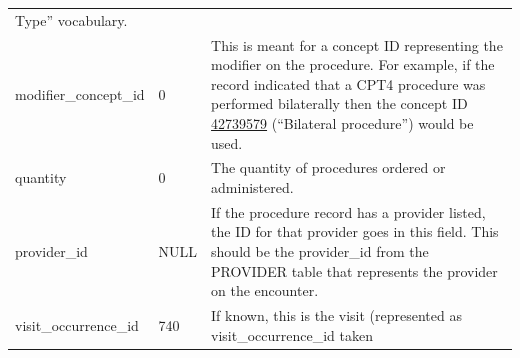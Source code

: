 \documentclass[11pt]{book}
\begin{document}
\begin{longtable}[]{@{}lll@{}}
\begin{minipage}[t]{0.48\columnwidth}
Type'' vocabulary.\strut
\end{minipage}\tabularnewline
\begin{minipage}[t]{0.28\columnwidth}\raggedright\strut
modifier\_concept\_id\strut
\end{minipage} & \begin{minipage}[t]{0.16\columnwidth}\raggedright\strut
0\strut
\end{minipage} & \begin{minipage}[t]{0.48\columnwidth}\raggedright\strut
This is meant for a concept ID representing the modifier on the
procedure. For example, if the record indicated that a CPT4 procedure
was performed bilaterally then the concept ID
\href{http://athena.ohdsi.org/search-terms/terms/42739579}{42739579}
(``Bilateral procedure'') would be used.\strut
\end{minipage}\tabularnewline
\begin{minipage}[t]{0.28\columnwidth}\raggedright\strut
quantity\strut
\end{minipage} & \begin{minipage}[t]{0.16\columnwidth}\raggedright\strut
0\strut
\end{minipage} & \begin{minipage}[t]{0.48\columnwidth}\raggedright\strut
The quantity of procedures ordered or administered.\strut
\end{minipage}\tabularnewline
\begin{minipage}[t]{0.28\columnwidth}\raggedright\strut
provider\_id\strut
\end{minipage} & \begin{minipage}[t]{0.16\columnwidth}\raggedright\strut
NULL\strut
\end{minipage} & \begin{minipage}[t]{0.48\columnwidth}\raggedright\strut
If the procedure record has a provider listed, the ID for that provider
goes in this field. This should be the provider\_id from the PROVIDER
table that represents the provider on the encounter.\strut
\end{minipage}\tabularnewline
\begin{minipage}[t]{0.28\columnwidth}\raggedright\strut
visit\_occurrence\_id\strut
\end{minipage} & \begin{minipage}[t]{0.16\columnwidth}\raggedright\strut
740\strut
\end{minipage} & \begin{minipage}[t]{0.48\columnwidth}\raggedright\strut
If known, this is the visit (represented as visit\_occurrence\_id taken

\end{minipage}
\end{longtable}
\end{document}
